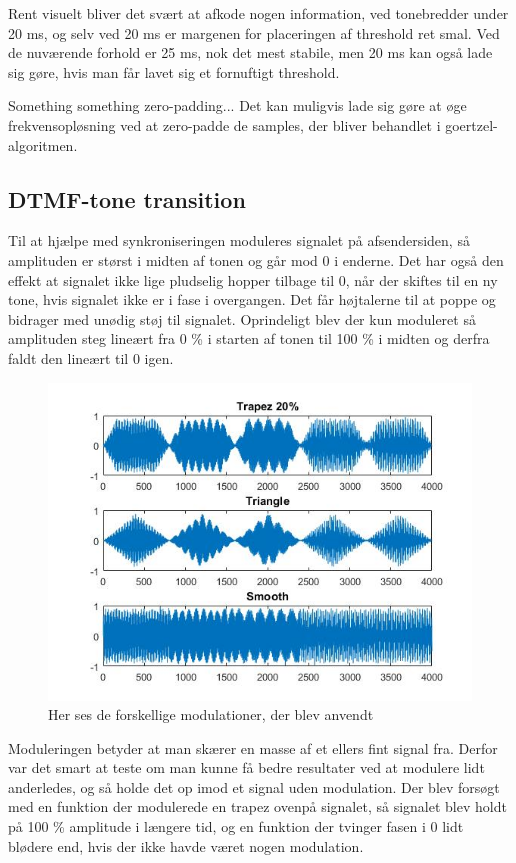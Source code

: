 Rent visuelt bliver det svært at afkode nogen information, ved tonebredder under 20 ms, og selv ved 20 ms er margenen for placeringen af threshold ret smal. Ved de nuværende forhold er 25 ms, nok det mest stabile, men 20 ms kan også lade sig gøre, hvis man får lavet sig et fornuftigt threshold.

Something something zero-padding... Det kan muligvis lade sig gøre at øge frekvensopløsning ved at zero-padde de samples, der bliver behandlet i goertzel-algoritmen.

\subsection{DTMF-tone transition}

Til at hjælpe med synkroniseringen moduleres signalet på afsendersiden, så amplituden er størst i midten af tonen og går mod 0 i enderne. Det har også den effekt at signalet ikke lige pludselig hopper tilbage til 0, når der skiftes til en ny tone, hvis signalet ikke er i fase i overgangen. Det får højtalerne til at poppe og bidrager med unødig støj til signalet. Oprindeligt blev der kun moduleret så amplituden steg lineært fra 0 \% i starten af tonen til 100 \% i midten og derfra faldt den lineært til 0 igen. 

\begin{figure}[ht]
\centering
\includegraphics[scale=0.6]{Billeder/Modulation.PNG}
\caption{Her ses de forskellige modulationer, der blev anvendt}
\label{fig:modulation}
\end{figure} 

Moduleringen betyder at man skærer en masse af et ellers fint signal fra. Derfor var det smart at teste om man kunne få bedre resultater ved at modulere lidt anderledes, og så holde det op imod et signal uden modulation. Der blev forsøgt med en funktion der modulerede en trapez ovenpå signalet, så signalet blev holdt på 100 \% amplitude i længere tid, og en funktion der tvinger fasen i 0 lidt blødere end, hvis der ikke havde været nogen modulation. 

